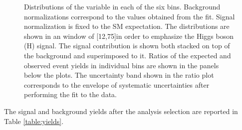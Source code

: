 \begin{figure}[!htbp]
{}
\caption{Distributions of the \mt variable in each of the six \pth{} bins. Background normalizations correspond to the values obtained from the fit. Signal normalization is fixed to the SM expectation. The distributions are shown in an \mll window of [12,75]\GeV in order to emphasize the Higgs boson (H) signal. The signal contribution is shown both stacked on top of the background and superimposed to it. Ratios of the expected and observed event yields in individual bins are shown in the panels below the plots. The uncertainty band shown in the ratio plot corresponds to the envelope of systematic uncertainties after performing the fit to the data.}\label{fig:mTSignalRegion}
\end{figure}

The signal and background yields after the analysis selection are reported in Table \ref{table:yields}.

